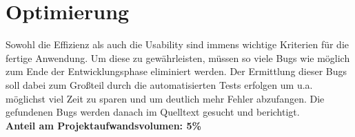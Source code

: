 \section{Optimierung}
Sowohl die Effizienz als auch die Usability sind immens wichtige Kriterien für die fertige Anwendung. Um diese zu gewährleisten, müssen so viele Bugs wie möglich zum Ende der Entwicklungsphase eliminiert werden. Der Ermittlung dieser Bugs soll dabei zum Großteil durch die automatisierten Tests erfolgen um u.a. möglichst viel Zeit zu sparen und um deutlich mehr Fehler abzufangen. Die gefundenen Bugs werden danach im Quelltext gesucht und berichtigt. \\
\textbf{Anteil am Projektaufwandsvolumen: 5\%}
